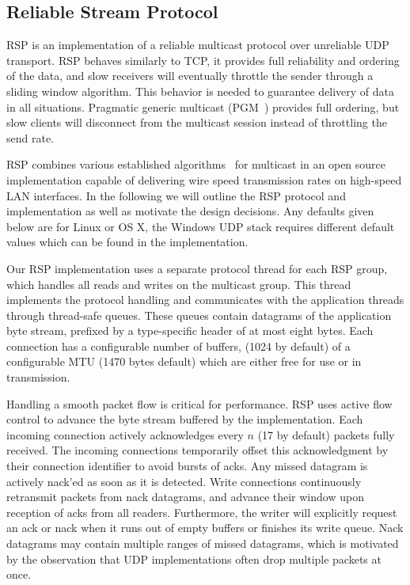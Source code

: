 \documentclass[10pt,journal,compsoc]{IEEEtran}
\begin{document}
\subsection{Reliable Stream Protocol}\label{sec:RSP}

RSP is an implementation of a reliable multicast protocol over unreliable UDP
transport. RSP behaves similarly to TCP, it provides full reliability and
ordering of the data, and slow receivers will eventually throttle the sender
through a sliding window algorithm. This behavior is needed to guarantee
delivery of data in all situations. Pragmatic generic multicast (PGM~\cite{pgm})
provides full ordering, but slow clients will disconnect from the multicast
session instead of throttling the send rate.

RSP combines various established algorithms~\cite{adamson2004negative,
  Gau:2002:MFC:506824.506832} for multicast in an open source implementation
capable of delivering wire speed transmission rates on high-speed LAN
interfaces. In the following we will outline the RSP protocol and implementation
as well as motivate the design decisions. Any defaults given below are for
Linux or OS X, the Windows UDP stack requires different default values which can
be found in the implementation.

Our RSP implementation uses a separate protocol thread for each RSP group, which
handles all reads and writes on the multicast group. This thread implements the
protocol handling and communicates with the application threads through
thread-safe queues. These queues contain datagrams of the application byte
stream, prefixed by a type-specific header of at most eight bytes. Each
connection has a configurable number of buffers, (1024 by default) of a
configurable MTU (1470 bytes default) which are either free for use or in
transmission.

Handling a smooth packet flow is critical for performance. RSP uses active flow
control to advance the byte stream buffered by the implementation. Each incoming
connection actively acknowledges every $n$ (17 by default) packets fully
received. The incoming connections temporarily offset this acknowledgment by
their connection identifier to avoid bursts of acks. Any missed datagram is
actively nack'ed as soon as it is detected. Write connections continuously
retransmit packets from nack datagrams, and advance their window upon reception
of acks from all readers. Furthermore, the writer will explicitly request an ack
or nack when it runs out of empty buffers or finishes its write queue. Nack
datagrams may contain multiple ranges of missed datagrams, which is motivated by
the observation that UDP implementations often drop multiple packets at once.
\end{document}
